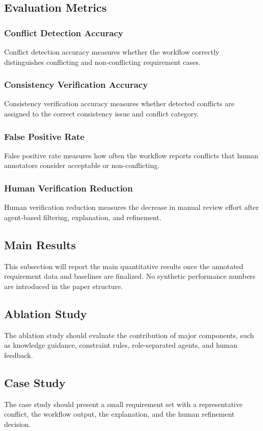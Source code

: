 \subsection{Evaluation Metrics}

\subsubsection{Conflict Detection Accuracy}
Conflict detection accuracy measures whether the workflow correctly distinguishes
conflicting and non-conflicting requirement cases.

\subsubsection{Consistency Verification Accuracy}
Consistency verification accuracy measures whether detected conflicts are assigned
to the correct consistency issue and conflict category.

\subsubsection{False Positive Rate}
False positive rate measures how often the workflow reports conflicts that human
annotators consider acceptable or non-conflicting.

\subsubsection{Human Verification Reduction}
Human verification reduction measures the decrease in manual review effort after
agent-based filtering, explanation, and refinement.

\subsection{Main Results}
This subsection will report the main quantitative results once the annotated
requirement data and baselines are finalized. No synthetic performance numbers are
introduced in the paper structure.

\subsection{Ablation Study}
The ablation study should evaluate the contribution of major components, such as
knowledge guidance, constraint rules, role-separated agents, and human feedback.

\subsection{Case Study}
The case study should present a small requirement set with a representative conflict,
the workflow output, the explanation, and the human refinement decision.
